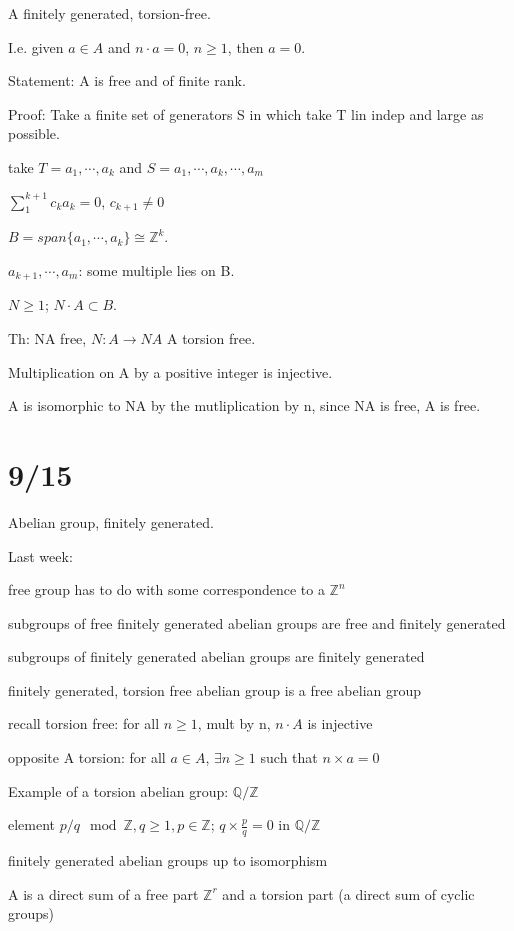 \documentclass[12pt]{article}
\begin{document}
\noindent
A finitely generated, torsion-free.

I.e. given $a \in A$ and $n \cdot a = 0$, $n \geq 1$, then $a = 0$.

Statement: A is free and of finite rank.

\noindent
Proof: Take a finite set of generators S in which take T lin indep and large as possible.

take $T = a_1, \cdots, a_k$ and $S = a_1, \cdots, a_k, \cdots, a_m$

$\sum_{1}^{k + 1} c_ka_k = 0$, $c_{k+1} \neq 0$

$B = span\{a_1, \cdots, a_k\} \cong \mathds{Z}^k$.

$a_{k + 1}, \cdots,a_m$: some multiple lies on B.

$N \geq 1$; $N \cdot A \subset B$.

Th: NA free, $N: A \to NA$ A torsion free.

Multiplication on A by a positive integer is injective.

A is isomorphic to NA by the mutliplication by n, since NA is free, A is free.

\section{9/15}

Abelian group, finitely generated.

\noindent
Last week:

free group has to do with some correspondence to a $\mathds{Z}^n$

subgroups of free finitely generated abelian groups are free and finitely generated

subgroups of finitely generated abelian groups are finitely generated

finitely generated, torsion free abelian group is a free abelian group

recall torsion free: for all $n \geq 1$, mult by n, $n \cdot A$ is injective

opposite A torsion: for all $a \in A$, $\exists n \geq 1$ such that $n \times a = 0$

\noindent
Example of a torsion abelian group: $\mathds{Q}/\mathds{Z}$

element $p/q \mod{\mathds{Z}}, q \geq 1, p \in \mathds{Z}$; $q \times \frac{p}{q} = 0$ in $\mathds{Q}/\mathds{Z}$

\noindent
finitely generated abelian groups up to isomorphism

A is a direct sum of a free part $\mathds{Z}^r$ and a torsion part (a direct sum of cyclic groups)
\end{document}
